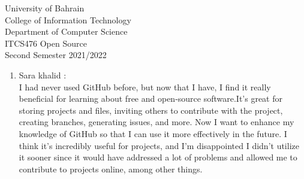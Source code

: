 \documentclass[12pt]{article}
\begin{document}
   \begin{enumerate}
   {\Large University of Bahrain}\\
   College of Information Technology\\
   Department of Computer Science\\
   ITCS476 Open Source\\
   Second Semester 2021/2022\\[0.2cm]
 

\bigskip
   \renewcommand{\arraystretch}{1.4}   %
   
   \end{enumerate}

\begin{enumerate}
  \item Sara khalid :\\
   I had never used GitHub before, but now that I have, I find it really beneficial for learning about free and open-source software.It's great for storing projects and files, inviting others to contribute with the project, creating branches, generating issues, and more. Now I want to enhance my knowledge of GitHub so that I can use it more effectively in the future. I think it's incredibly useful for projects, and I'm disappointed I didn't utilize it sooner since it would have addressed a lot of problems and allowed me to contribute to projects online, among other things.\\
      
\end{enumerate}
\end{document}
